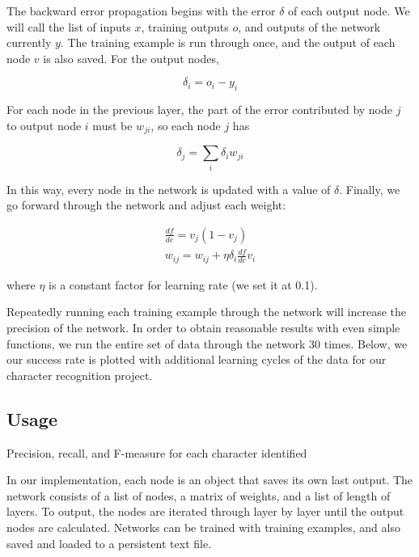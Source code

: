 \documentclass[11pt,a4paper]{article}
\begin{document}
The backward error propagation begins with the error $\delta$ of each output node. We will call the list of inputs $x$, training outputs $o$, and outputs of the network currently $y$. The training example is run through once, and the output of each node $v$ is also saved. For the output nodes,

\[
\delta_i = o_i - y_i
\]

For each node in the previous layer, the part of the error contributed by node $j$ to output node $i$ must be $w_{ji}$, so each node $j$ has

\[
\delta_j = \sum_i{\delta_i w_{ji}}
\]

In this way, every node in the network is updated with a value of $\delta$. Finally, we go forward through the network and adjust each weight:

\begin{gather*}
\frac{df}{de} = v_j (1 - v_j) \\
w_{ij} = w_{ij} + \eta \delta_i \frac{df}{de}v_i
\end{gather*}

where $\eta$ is a constant factor for learning rate (we set it at 0.1).

Repeatedly running each training example through the network will increase the precision of the network. In order to obtain reasonable results with even simple functions, we run the entire set of data through the network 30 times. Below, we our success rate is plotted with additional learning cycles of the data for our character recognition project.

\subsection{Usage} 
\label{Artificial Neural Nets:Usage}

\begin{table}
\vspace{-15px}
\caption{Precision, recall, and F-measure for each character identified}
\vspace{0px}
\end{table}

In our implementation, each node is an object that saves its own last output. The network consists of a list of nodes, a matrix of weights, and a list of length of layers. To output, the nodes are iterated through layer by layer until the output nodes are calculated. Networks can be trained with training examples, and also saved and loaded to a persistent text file.
\end{document}
